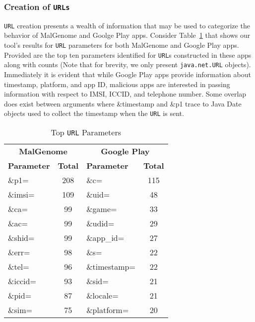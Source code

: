 \subsubsection{Creation of \texttt{URLs}}
\texttt{URL} creation presents a wealth of information that may be used to
categorize the behavior of MalGenome and Goolge Play apps.  Consider
Table~\ref{table:up} that shows our tool's results for \texttt{URL} parameters
for both MalGenome and Google Play apps.  Provided are the top ten parameters
identified for \texttt{URL}s constructed in these apps along with counts (Note
that for brevity, we only present \texttt{java.net.URL} objects).  Immediately
it is evident that while Google Play apps provide information about timestamp,
platform, and app ID, malicious apps are interested in passing information with
respect to IMSI, ICCID, and telephone number.  Some overlap does exist between
arguments where \&timestamp and \&p1 trace to Java Date objects used to collect
the timestamp when the \texttt{URL} is sent.

\begin{table}[t]
  \begin{center}
    {\small
\begin{tabular}{|l|c|l|c|}
\hline
\multicolumn{2}{|c|}{{\bf MalGenome}} &    \multicolumn{2}{c|}{{\bf Google Play}} \\

\bf{Parameter} & \bf{Total} & \bf{Parameter}    & \bf{Total}\\
\hline
\&p1=     & 208	  & \&c=    & 115\\
\&imsi=   & 109   & \&uid=        & 48\\
\&ca=    & 99   & \&game=  & 33\\ 
\&ac=  & 99   & \&udid= & 29\\
\&shid=    & 99	  & \&app\_id= & 27\\
\&err=	  & 98	  & \&s=        &	22\\
\&tel=     & 96	  & \&timestamp=        & 22\\
\&iccid=     & 93	  & \&sid=      & 21\\
\&pid=   & 87   & \&locale=      & 21\\
\&sim=	  & 75	  & \&platform=        & 20\\
\hline
\end{tabular}
}
\vspace{.1in}
    \caption{Top \texttt{URL} Parameters}
    \label{table:up}
  \end{center}
\end{table}


